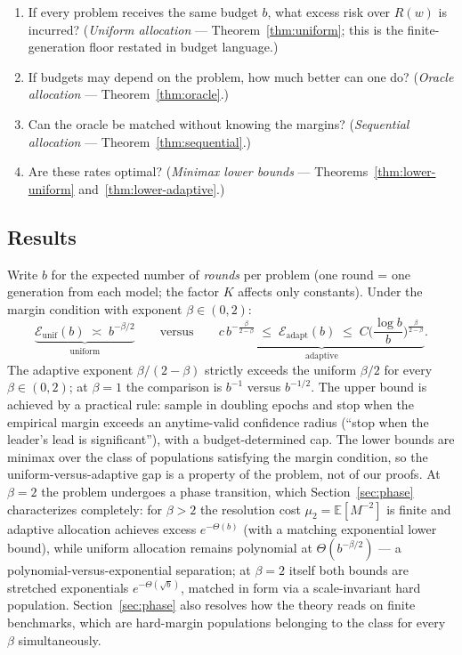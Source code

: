 \documentclass[11pt]{article}
\newcommand{\E}{\mathbb E}
\newcommand{\wfix}{w}
\begin{document}
\begin{enumerate}
\item If every problem receives the same budget $b$, what excess risk over
$R(\wfix)$ is incurred?  (\emph{Uniform allocation} --- Theorem~\ref{thm:uniform};
this is the finite-generation floor restated in budget language.)
\item If budgets may depend on the problem, how much better can one do?
(\emph{Oracle allocation} --- Theorem~\ref{thm:oracle}.)
\item Can the oracle be matched without knowing the margins?
(\emph{Sequential allocation} --- Theorem~\ref{thm:sequential}.)
\item Are these rates optimal?  (\emph{Minimax lower bounds} ---
Theorems~\ref{thm:lower-uniform} and~\ref{thm:lower-adaptive}.)
\end{enumerate}

\subsection{Results}

Write $b$ for the expected number of \emph{rounds} per problem (one round =
one generation from each model; the factor $K$ affects only constants).
Under the margin condition with exponent $\beta\in(0,2)$:
\[
\underbrace{\mathcal E_{\mathrm{unif}}(b)\;\asymp\;b^{-\beta/2}}_{\text{uniform}}
\qquad\text{versus}\qquad
\underbrace{c\,b^{-\frac{\beta}{2-\beta}}
\;\le\;\mathcal E_{\mathrm{adapt}}(b)\;\le\;
C\Big(\frac{\log b}{b}\Big)^{\frac{\beta}{2-\beta}}}_{\text{adaptive}} .
\]
The adaptive exponent $\beta/(2-\beta)$ strictly exceeds the uniform
$\beta/2$ for every $\beta\in(0,2)$; at $\beta=1$ the comparison is $b^{-1}$
versus $b^{-1/2}$.  The upper bound is achieved by a practical rule: sample
in doubling epochs and stop when the empirical margin exceeds an
anytime-valid confidence radius (``stop when the leader's lead is
significant''), with a budget-determined cap.  The lower bounds are minimax
over the class of populations satisfying the margin condition, so the
uniform-versus-adaptive gap is a property of the problem, not of our proofs.
At $\beta=2$ the problem undergoes a phase transition, which
Section~\ref{sec:phase} characterizes completely: for $\beta>2$ the
resolution cost $\mu_2=\E[M^{-2}]$ is finite and adaptive allocation
achieves excess $e^{-\Theta(b)}$ (with a matching exponential lower bound),
while uniform allocation remains polynomial at $\Theta(b^{-\beta/2})$ ---
a polynomial-versus-exponential separation; at $\beta=2$ itself both bounds
are stretched exponentials $e^{-\Theta(\sqrt b)}$, matched in form via a
scale-invariant hard population.  Section~\ref{sec:phase} also resolves how
the theory reads on finite benchmarks, which are hard-margin populations
belonging to the class for every $\beta$ simultaneously.
\end{document}
